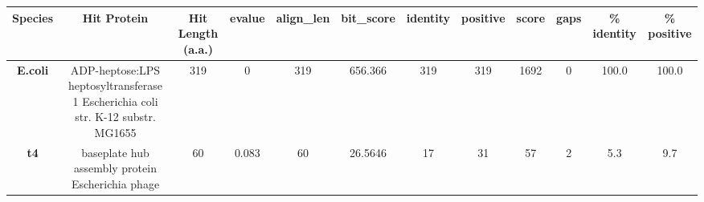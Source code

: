 \begin{tabular}{|c|c|c|c|c|c|c|c|c|c|c|c|} \hline
\textbf{Species} & \textbf{Hit Protein} & \textbf{Hit Length (a.a.)} & \textbf{evalue} & \textbf{align\_len} & \textbf{bit\_score} & \textbf{identity} & \textbf{positive} & \textbf{score} & \textbf{gaps} & \textbf{\% identity} & \textbf{\% positive} \\ \hline
\textbf{E.coli} & ADP-heptose:LPS heptosyltransferase 1 Escherichia coli str. K-12 substr. MG1655 & 319 & 0 & 319 & 656.366 & 319 & 319 & 1692 & 0 & 100.0 & 100.0\\
\textbf{t4} & baseplate hub assembly protein Escherichia phage  & 60 & 0.083 & 60 & 26.5646 & 17 & 31 & 57 & 2 & 5.3 & 9.7\\
\hline \end{tabular}
